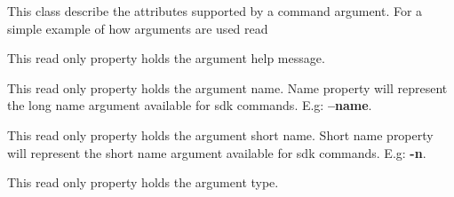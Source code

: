 \documentclass[letterpaper,10pt,english]{sphinxmanual}
\begin{document}
\begin{fulllineitems}
\label{features/sdk:fantastico.sdk.sdk_core.SdkCommandArgument}
This class describe the attributes supported by a command argument. For a simple example of how arguments are used
read {\hyperref[features/sdk:fantastico.sdk.sdk_core.SdkCommand]{}}

\begin{fulllineitems}
\label{features/sdk:fantastico.sdk.sdk_core.SdkCommandArgument.help}
This read only property holds the argument help message.

\end{fulllineitems}


\begin{fulllineitems}
\label{features/sdk:fantastico.sdk.sdk_core.SdkCommandArgument.name}
This read only property holds the argument name. Name property will represent the long name argument available for
sdk commands. E.g: \textbf{--name}.

\end{fulllineitems}


\begin{fulllineitems}
\label{features/sdk:fantastico.sdk.sdk_core.SdkCommandArgument.short_name}
This read only property holds the argument short name. Short name property will represent the short name argument
available for sdk commands. E.g: \textbf{-n}.

\end{fulllineitems}


\begin{fulllineitems}
\label{features/sdk:fantastico.sdk.sdk_core.SdkCommandArgument.type}
This read only property holds the argument type.

\end{fulllineitems}


\end{fulllineitems}
\end{document}

